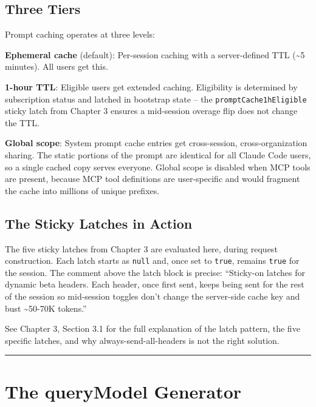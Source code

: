 \documentclass[
  english,
  11pt,
  letterpaper,
]{book}
\begin{document}
\subsection{Three Tiers}\label{three-tiers}

Prompt caching operates at three levels:

\textbf{Ephemeral cache} (default): Per-session caching with a
server-defined TTL (\textasciitilde5 minutes). All users get this.

\textbf{1-hour TTL}: Eligible users get extended caching. Eligibility is
determined by subscription status and latched in bootstrap state -- the
\texttt{promptCache1hEligible} sticky latch from Chapter 3 ensures a
mid-session overage flip does not change the TTL.

\textbf{Global scope}: System prompt cache entries get cross-session,
cross-organization sharing. The static portions of the prompt are
identical for all Claude Code users, so a single cached copy serves
everyone. Global scope is disabled when MCP tools are present, because
MCP tool definitions are user-specific and would fragment the cache into
millions of unique prefixes.

\subsection{The Sticky Latches in
Action}\label{the-sticky-latches-in-action}

The five sticky latches from Chapter 3 are evaluated here, during
request construction. Each latch starts as \texttt{null} and, once set
to \texttt{true}, remains \texttt{true} for the session. The comment
above the latch block is precise: ``Sticky-on latches for dynamic beta
headers. Each header, once first sent, keeps being sent for the rest of
the session so mid-session toggles don't change the server-side cache
key and bust \textasciitilde50-70K tokens.''

See Chapter 3, Section 3.1 for the full explanation of the latch
pattern, the five specific latches, and why always-send-all-headers is
not the right solution.

\begin{center}\rule{0.5\linewidth}{0.5pt}\end{center}

\section{The queryModel Generator}\label{the-querymodel-generator}
\end{document}

